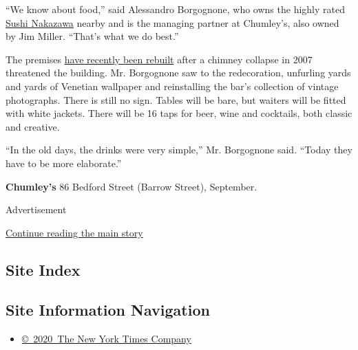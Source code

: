 ``We know about food,'' said Alessandro Borgognone, who owns the highly
rated
\href{http://www.nytimes3xbfgragh.onion/2013/12/11/dining/reviews/restaurant-review-sushi-nakazawa-in-the-west-village.html}{Sushi
Nakazawa} nearby and is the managing partner at Chumley's, also owned by
Jim Miller. ``That's what we do best.''

The premises
\href{http://www.nytimes3xbfgragh.onion/2016/08/08/nyregion/chumleys-is-set-to-come-back-and-it-still-wont-be-easy-to-find.html}{have
recently been rebuilt} after a chimney collapse in 2007 threatened the
building. Mr. Borgognone saw to the redecoration, unfurling yards and
yards of Venetian wallpaper and reinstalling the bar's collection of
vintage photographs. There is still no sign. Tables will be bare, but
waiters will be fitted with white jackets. There will be 16 taps for
beer, wine and cocktails, both classic and creative.

``In the old days, the drinks were very simple,'' Mr. Borgognone said.
``Today they have to be more elaborate.''

\textbf{Chumley's} 86 Bedford Street (Barrow Street), September.

Advertisement

\protect\hyperlink{after-bottom}{Continue reading the main story}

\hypertarget{site-index}{%
\subsection{Site Index}\label{site-index}}

\hypertarget{site-information-navigation}{%
\subsection{Site Information
Navigation}\label{site-information-navigation}}

\begin{itemize}
\tightlist
\item
  \href{https://help.nytimes3xbfgragh.onion/hc/en-us/articles/115014792127-Copyright-notice}{©~2020~The
  New York Times Company}
\end{itemize}

